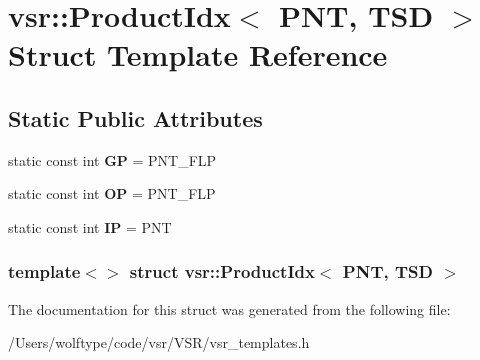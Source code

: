 \hypertarget{structvsr_1_1_product_idx_3_01_p_n_t_00_01_t_s_d_01_4}{\section{vsr\-:\-:Product\-Idx$<$ P\-N\-T, T\-S\-D $>$ Struct Template Reference}
\label{structvsr_1_1_product_idx_3_01_p_n_t_00_01_t_s_d_01_4}
}
\subsection*{Static Public Attributes}
\begin{DoxyCompactItemize}
\item 
\hypertarget{structvsr_1_1_product_idx_3_01_p_n_t_00_01_t_s_d_01_4_a8c27bb32985e1bd6c612d6eff2ee10a4}{static const int {\bfseries G\-P} = P\-N\-T\-\_\-\-F\-L\-P}\label{structvsr_1_1_product_idx_3_01_p_n_t_00_01_t_s_d_01_4_a8c27bb32985e1bd6c612d6eff2ee10a4}

\item 
\hypertarget{structvsr_1_1_product_idx_3_01_p_n_t_00_01_t_s_d_01_4_a1909bf339b05dae73d76555e957f6584}{static const int {\bfseries O\-P} = P\-N\-T\-\_\-\-F\-L\-P}\label{structvsr_1_1_product_idx_3_01_p_n_t_00_01_t_s_d_01_4_a1909bf339b05dae73d76555e957f6584}

\item 
\hypertarget{structvsr_1_1_product_idx_3_01_p_n_t_00_01_t_s_d_01_4_a911561e1084b15eed22392876cbb0cb5}{static const int {\bfseries I\-P} = P\-N\-T}\label{structvsr_1_1_product_idx_3_01_p_n_t_00_01_t_s_d_01_4_a911561e1084b15eed22392876cbb0cb5}

\end{DoxyCompactItemize}
\subsubsection*{template$<$$>$ struct vsr\-::\-Product\-Idx$<$ P\-N\-T, T\-S\-D $>$}



The documentation for this struct was generated from the following file\-:\begin{DoxyCompactItemize}
\item 
/\-Users/wolftype/code/vsr/\-V\-S\-R/vsr\-\_\-templates.\-h\end{DoxyCompactItemize}
